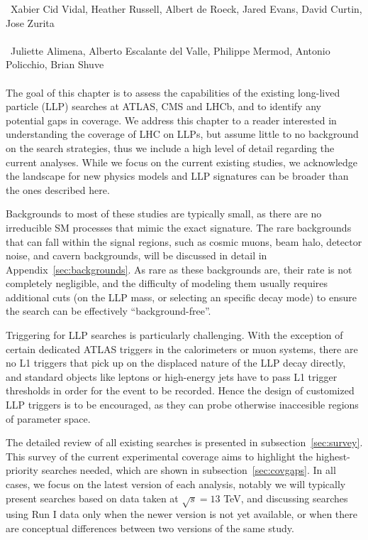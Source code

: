 ~Xabier Cid Vidal, Heather Russell, Albert de Roeck, Jared Evans, David Curtin, Jose Zurita\\
\text{ \; }\\
~Juliette Alimena, Alberto Escalante del Valle, Philippe Mermod, Antonio Policchio, Brian Shuve\\
\text{ \; }\\

\noindent The goal of this chapter is to assess the capabilities of the existing long-lived particle (LLP) searches at ATLAS, CMS and LHCb, and to identify any potential gaps in coverage.  We address this chapter to a reader interested in understanding the coverage of LHC on LLPs, but assume little to no background on the search strategies, thus we include a high level of detail regarding the current analyses. While we focus on the current existing studies, we acknowledge the landscape for new physics models and LLP signatures can be broader than the ones described here.

Backgrounds to most of these studies are typically small, as there are no irreducible SM processes that mimic the exact signature.  The rare backgrounds that can fall within the signal regions, such as cosmic muons, beam halo, detector noise, and cavern backgrounds, will be discussed in detail in Appendix~\ref{sec:backgrounds}. As rare as these backgrounds are, their rate is not completely negligible, and the difficulty of modeling them usually requires additional cuts (on the LLP mass, or selecting an specific decay mode) to ensure the search can be effectively ``background-free''.

Triggering for LLP searches is particularly challenging. With the exception of certain dedicated ATLAS triggers in the calorimeters or muon systems, there are no L1 triggers that pick up on the displaced nature of the LLP decay directly, and standard objects like leptons or high-energy jets have to pass L1 trigger thresholds in order for the event to be recorded. Hence the design of customized LLP triggers is to be encouraged, as they can probe otherwise inaccesible regions of parameter space.

The detailed review of all existing searches is presented in subsection~\ref{sec:survey}.
This survey of the current experimental coverage aims to highlight the highest-priority searches needed, which are shown in subsection~\ref{sec:covgaps}.
In all cases, we focus on the latest version of each analysis, notably we will typically present searches based on data taken at $\sqrt{s}=13$ TeV,  and discussing searches using Run I data only when the newer version is not yet available, or when there are conceptual differences between two versions of the same study.

